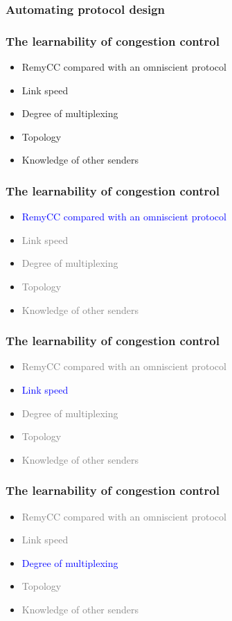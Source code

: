 \documentclass[svgnames]{beamer}
\begin{document}
\begin{Large}
\begin{frame}
\frametitle{Automating protocol design}
\noindent {}
\end{frame}

\begin{frame}
\frametitle{The learnability of congestion control}
\begin{itemize}
\item RemyCC compared with an omniscient protocol
\item Link speed
\item Degree of multiplexing
\item Topology
\item Knowledge of other senders
\end{itemize}
\end{frame}

\begin{frame}
\frametitle{The learnability of congestion control}
\begin{itemize}
\item \textcolor{blue}{RemyCC compared with an omniscient protocol}
\item \textcolor{gray}{Link speed}
\item \textcolor{gray}{Degree of multiplexing}
\item \textcolor{gray}{Topology}
\item \textcolor{gray}{Knowledge of other senders}
\end{itemize}
\end{frame}



\begin{frame}
\frametitle{The learnability of congestion control}
\begin{itemize}
\item \textcolor{gray}{RemyCC compared with an omniscient protocol}
\item \textcolor{blue}{Link speed}
\item \textcolor{gray}{Degree of multiplexing}
\item \textcolor{gray}{Topology}
\item \textcolor{gray}{Knowledge of other senders}
\end{itemize}
\end{frame}



\begin{frame}
\frametitle{The learnability of congestion control}
\begin{itemize}
\item \textcolor{gray}{RemyCC compared with an omniscient protocol}
\item \textcolor{gray}{Link speed}
\item \textcolor{blue}{Degree of multiplexing}
\item \textcolor{gray}{Topology}
\item \textcolor{gray}{Knowledge of other senders}
\end{itemize}
\end{frame}


\end{Large}
\end{document}
